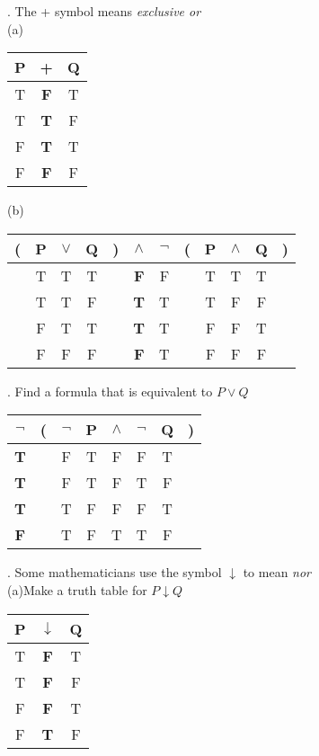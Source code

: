 \documentclass{article}
\begin{document}
\vspace{2em}
. The + symbol means \textit{exclusive or}\\
(a)
\linebreak
\begin{tabular}{ccc}
P&+&Q\\
\hline
T&\textbf{F}&T\\
T&\textbf{T}&F\\
F&\textbf{T}&T\\
F&\textbf{F}&F\\
\end{tabular}
\vspace{2em}
\linebreak
(b)
\begin{tabular}{cccccccccccc}
(&P&$\vee$&Q&)&$\wedge$&$\neg$&(&P&$\wedge$&Q&)\\
\hline
&T&T&T&&\textbf{F}&F&&T&T&T&\\
&T&T&F&&\textbf{T}&T&&T&F&F&\\
&F&T&T&&\textbf{T}&T&&F&F&T&\\
&F&F&F&&\textbf{F}&T&&F&F&F&\\
\end{tabular}
\vspace{2em}
. Find a formula that is equivalent to $P \vee Q$\\
\begin{tabular}{cccccccc}
$\neg$&(&$\neg$&P&$\wedge$&$\neg$&Q&)\\
\hline
\textbf{T}&&F&T&F&F&T&\\
\textbf{T}&&F&T&F&T&F&\\
\textbf{T}&&T&F&F&F&T&\\
\textbf{F}&&T&F&T&T&F&\\
\end{tabular}
\vspace{2em}
. Some mathematicians use the symbol $\downarrow$ to mean \textit{nor}\\
(a)Make a truth table for $P \downarrow Q$\\
\begin{tabular}{ccc}
P&$\downarrow$&Q\\
\hline
T&\textbf{F}&T\\
T&\textbf{F}&F\\
F&\textbf{F}&T\\
F&\textbf{T}&F\\
\end{tabular}
\end{document}
